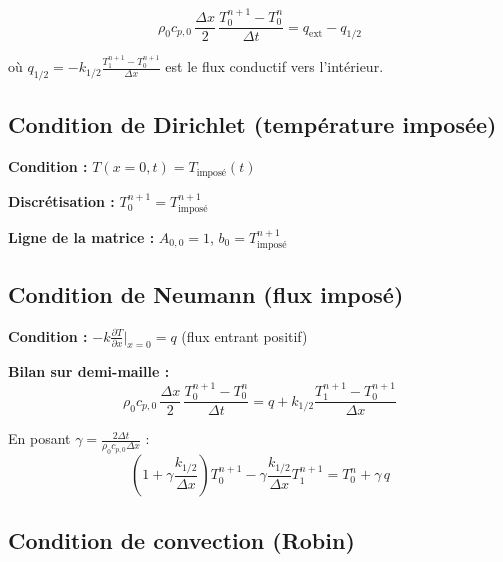 \documentclass[11pt,a4paper]{article}
\begin{document}
\begin{equation}
\rho_0 c_{p,0} \, \frac{\Delta x}{2} \, \frac{T_0^{n+1} - T_0^n}{\Delta t} = q_{\text{ext}} - q_{1/2}
\end{equation}

où $q_{1/2} = -k_{1/2} \frac{T_1^{n+1} - T_0^{n+1}}{\Delta x}$ est le flux conductif vers l'intérieur.

\subsection{Condition de Dirichlet (température imposée)}

\begin{tcolorbox}[colback=gray!5,colframe=gray!50!black]
\textbf{Condition :} $T(x=0, t) = T_{\text{imposé}}(t)$

\textbf{Discrétisation :} $T_0^{n+1} = T_{\text{imposé}}^{n+1}$

\textbf{Ligne de la matrice :} $A_{0,0} = 1$, $b_0 = T_{\text{imposé}}^{n+1}$
\end{tcolorbox}

\subsection{Condition de Neumann (flux imposé)}

\begin{tcolorbox}[colback=gray!5,colframe=gray!50!black]
\textbf{Condition :} $-k \frac{\partial T}{\partial x}\Big|_{x=0} = q$ (flux entrant positif)

\textbf{Bilan sur demi-maille :}
\begin{equation}
\rho_0 c_{p,0} \, \frac{\Delta x}{2} \, \frac{T_0^{n+1} - T_0^n}{\Delta t} = q + k_{1/2} \frac{T_1^{n+1} - T_0^{n+1}}{\Delta x}
\end{equation}

En posant $\gamma = \frac{2\Delta t}{\rho_0 c_{p,0} \Delta x}$ :
\begin{equation}
\left(1 + \gamma \frac{k_{1/2}}{\Delta x}\right) T_0^{n+1} - \gamma \frac{k_{1/2}}{\Delta x} T_1^{n+1} = T_0^n + \gamma \, q
\end{equation}
\end{tcolorbox}

\subsection{Condition de convection (Robin)}
\end{document}
